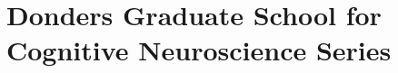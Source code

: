 \clearpage
\pagestyle{empty}

\chapter*{Donders Graduate School for Cognitive Neuroscience Series}
{}%

\npar\npar
\footnotesize
\noindent

\newcommand{\dientry}[8]{%
\noindent #1. #2 (#3). %
\IfSubStr{#8}{/}{%
\href{http://dx.doi.org/#8}{\emph{#4}}
}{%
\emph{#4}  
}%
#5, #6, #7\npar%
}


